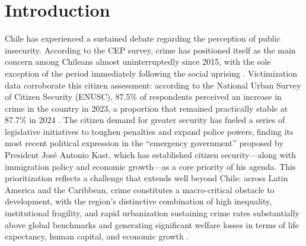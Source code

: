 \documentclass[pdflatex,sn-basic]{sn-jnl}
\begin{document}

\maketitle

\section{Introduction}

Chile has experienced a sustained debate regarding the perception of public insecurity. According to the CEP survey, crime has positioned itself as the main concern among Chileans almost uninterruptedly since 2015, with the sole exception of the period immediately following the social uprising \citep{cep2025}. Victimization data corroborate this citizen assessment: according to the National Urban Survey of Citizen Security (ENUSC), 87.5\% of respondents perceived an increase in crime in the country in 2023, a proportion that remained practically stable at 87.7\% in 2024 \citep{ine2025enusc}. The citizen demand for greater security has fueled a series of legislative initiatives to toughen penalties and expand police powers, finding its most recent political expression in the ``emergency government'' proposed by President Jos\'e Antonio Kast, which has established citizen security---along with immigration policy and economic growth---as a core priority of his agenda. This prioritization reflects a challenge that extends well beyond Chile: across Latin America and the Caribbean, crime constitutes a macro-critical obstacle to development, with the region's distinctive combination of high inequality, institutional fragility, and rapid urbanization sustaining crime rates substantially above global benchmarks and generating significant welfare losses in terms of life expectancy, human capital, and economic growth \citep{soares2010,bisca2024}.
\end{document}
